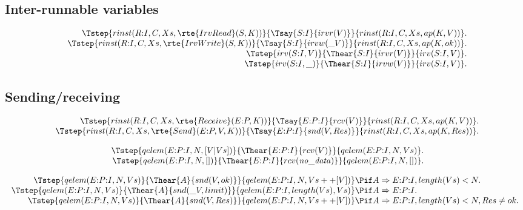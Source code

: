 \subsection{Inter-runnable variables}

\[
\begin{array}{r@{}c@{}l}
  \Tstep{rinst(R{:}I, C, Xs, \rte{IrvRead}(S,K))} {\Tsay{S{:}I}{irvr(V)}}  {rinst(R{:}I, C, Xs, ap(K,V))}  .
\\\Tstep{rinst(R{:}I, C, Xs, \rte{IrvWrite}(S,K))}{\Tsay{S{:}I}{irvw(\_V)}}{rinst(R{:}I, C, Xs, ap(K,ok))} .
\\\Tstep{irv(S{:}I, V)}                           {\Thear{S{:}I}{irvr(V)}} {irv(S{:}I, V)}                 .
\\\Tstep{irv(S{:}I,\_)}                           {\Thear{S{:}I}{irvw(V)}} {irv(S{:}I, V)}                 .
\end{array}
\]


\subsection{Sending/receiving}

\[
\begin{array}{r@{}c@{}l}
  \Tstep{rinst(R{:}I, C, Xs, \rte{Receive}(E{:}P,K))}{\Tsay{E{:}P{:}I}{rcv(V)}}    {rinst(R{:}I, C, Xs, ap(K,V))} .
\\\Tstep{rinst(R{:}I, C, Xs, \rte{Send}(E{:}P,V,K))} {\Tsay{E{:}P{:}I}{snd(V,Res)}}{rinst(R{:}I, C, Xs, ap(K,Res))}.
\end{array}
\]

\newcommand{\nodata}{\ensuremath{\mathit{no\_data}}}
\[
\begin{array}{r@{}c@{}l}
  \Tstep{qelem(E{:}P{:}I, N, [V|Vs])}{\Thear{E{:}P{:}I}{rcv(V)}}      {qelem(E{:}P{:}I, N, Vs)}    .
\\\Tstep{qelem(E{:}P{:}I, N, [])}    {\Thear{E{:}P{:}I}{rcv(\nodata)}}{qelem(E{:}P{:}I, N, [])}    .
\end{array}
\]


\[
\begin{array}{r@{}c@{}lcl}
  \Tstep{qelem(E{:}P{:}I, N, Vs)}{\Thear{A}{snd(V,ok)}}{qelem(E{:}P{:}I, N, Vs++[V])}
    &\Pif &   A\Rightarrow{}E{:}P{:}I, length(Vs) < N.
\\\Tstep{qelem(E{:}P{:}I, N, Vs)}{\Thear{A}{snd(\_V,limit)}}{qelem(E{:}P{:}I, length(Vs), Vs)}
    &\Pif &   A\Rightarrow{}E{:}P{:}I    .
\\\Tstep{qelem(E{:}P{:}I, N, Vs)}{\Thear{A}{snd(V,Res)}}{qelem(E{:}P{:}I, N, Vs++[V])}
    &\Pif &   A\Rightarrow{}E{:}P{:}I, length(Vs) < N, Res \neq ok    .
\end{array}
\]

